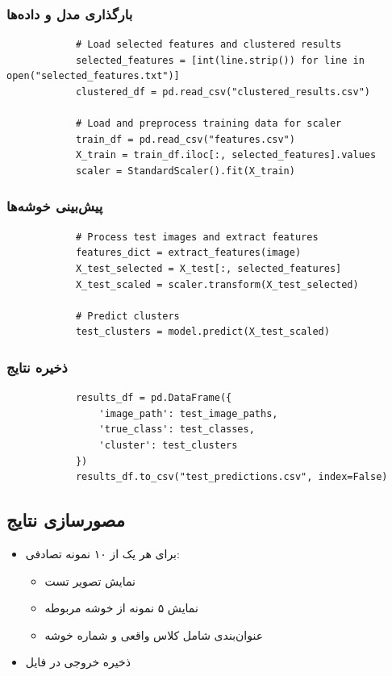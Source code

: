 \documentclass[a4paper,12pt]{article}
\begin{document}
	\subsubsection{بارگذاری مدل و داده‌ها}
	\begin{latin}
		\begin{verbatim}
			# Load selected features and clustered results
			selected_features = [int(line.strip()) for line in open("selected_features.txt")]
			clustered_df = pd.read_csv("clustered_results.csv")
			
			# Load and preprocess training data for scaler
			train_df = pd.read_csv("features.csv")
			X_train = train_df.iloc[:, selected_features].values
			scaler = StandardScaler().fit(X_train)
		\end{verbatim}
	\end{latin}
	
	\subsubsection{پیش‌بینی خوشه‌ها}
	\begin{latin}
		\begin{verbatim}
			# Process test images and extract features
			features_dict = extract_features(image)
			X_test_selected = X_test[:, selected_features]
			X_test_scaled = scaler.transform(X_test_selected)
			
			# Predict clusters
			test_clusters = model.predict(X_test_scaled)
		\end{verbatim}
	\end{latin}
	
	\subsubsection{ذخیره نتایج}
	\begin{latin}
		\begin{verbatim}
			results_df = pd.DataFrame({
				'image_path': test_image_paths,
				'true_class': test_classes,
				'cluster': test_clusters
			})
			results_df.to_csv("test_predictions.csv", index=False)
		\end{verbatim}
	\end{latin}
	
	\subsection{مصورسازی نتایج}
	\begin{itemize}
		\item برای هر یک از ۱۰ نمونه تصادفی:
		\begin{itemize}
			\item نمایش تصویر تست
			\item نمایش ۵ نمونه از خوشه مربوطه
			\item عنوان‌بندی شامل کلاس واقعی و شماره خوشه
		\end{itemize}
		\item ذخیره خروجی در فایل 
	\end{itemize}
	
\end{document}
